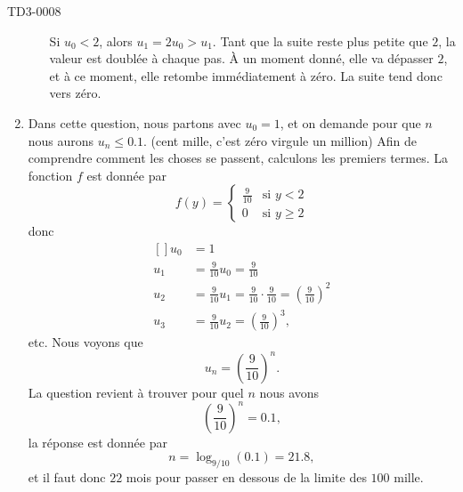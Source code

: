 \begin{corrige}{TD3-0008}
\begin{enumerate}
\begin{enumerate}
					Si $u_0<2$, alors $u_1=2u_0>u_1$. Tant que la suite reste plus petite que $2$, la valeur est doublée à chaque pas. À un moment donné, elle va dépasser $2$, et à ce moment, elle retombe immédiatement à zéro. La suite tend donc vers zéro.
					
			\end{enumerate}
			
		\item
			Dans cette question, nous partons avec $u_0=1$, et on demande pour que $n$ nous aurons $u_n\leq 0.1$. (cent mille, c'est zéro virgule un million) Afin de comprendre comment les choses se passent, calculons les premiers termes. La fonction $f$ est donnée par
			\begin{equation}		\label{EqLaFnfcandaad}
				f(y)=\begin{cases}
					\frac{ 9 }{ 10 }	&	\text{si }y<2\\
					0	&	 \text{si }y\geq 2
				\end{cases}
			\end{equation}
			donc
			\begin{equation}
				\begin{aligned}[]
					u_0&=1\\
					u_1&=\frac{ 9 }{ 10 }u_0=\frac{ 9 }{ 10 }\\
					u_2&=\frac{ 9 }{ 10 }u_1=\frac{ 9 }{ 10 }\cdot\frac{ 9 }{ 10 }=\left( \frac{ 9 }{ 10 } \right)^2\\
					u_3&=\frac{ 9 }{ 10 }u_2=\left( \frac{ 9 }{ 10 } \right)^3,
				\end{aligned}
			\end{equation}
			etc. Nous voyons que
			\begin{equation}
				u_n=\left( \frac{ 9 }{ 10 } \right)^n.
			\end{equation}
			La question revient à trouver pour quel $n$ nous avons
			\begin{equation}
				\left( \frac{ 9 }{ 10 } \right)^n=0.1,
			\end{equation}
			la réponse est donnée par
			\begin{equation}
				n=\log_{9/10}(0.1)=21.8,
			\end{equation}
			et il faut donc $22$ mois pour passer en dessous de la limite des $100$ mille.


\end{enumerate}
\end{corrige}

